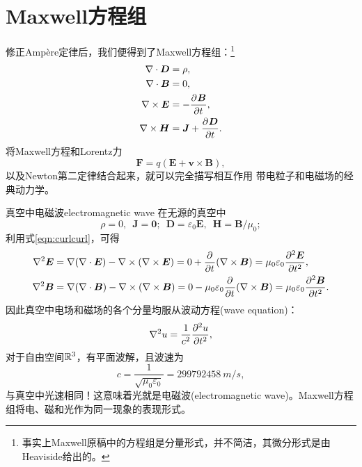 \section{Maxwell方程组}
修正Ampère定律后，我们便得到了Maxwell方程组：\footnote{事实上Maxwell原稿中的方程组是分量形式，并不简洁，其微分形式是由Heaviside给出的。}
\begin{subequations}
    \begin{align}
        \label{eqn:Maxwell divD}
        \div\bm D&=\rho,\\
        \label{eqn:Maxwell divB}
        \div\bm B&=0,\\
        \label{eqn:Maxwell curlE}
        \curl\bm E&=-\pv{\bm B}t,\\
        \label{eqn:Maxwell curlH}
        \curl\bm H&=\bm J+\pv{\bm D}t.
    \end{align}
\end{subequations}
将Maxwell方程和Lorentz力
\begin{equation}
    \label{eqn:Lorentz}
    \bm F=q(\bm E+\bm v\times\bm B),
\end{equation}
以及Newton第二定律结合起来，就可以完全描写相互作用 带电粒子和电磁场的经典动力学。
\begin{example}{真空中电磁波}{electromagnetic wave}
    在无源的真空中
    \[
        \rho=0,\enspace\bm J=\bm 0;\enspace\bm D=\varepsilon_0\bm E,\enspace\bm H=\bm B/\mu_0;
    \]
    利用式\eqref{eqn:curlcurl}，可得
    \begin{align*}
        \lapla\bm E&=\nabla(\div\bm E)-\curl(\curl\bm E)=0+\pp t(\curl\bm B)
        =\mu_0\varepsilon_0\pv[2]{\bm E}t,\\
        \lapla\bm B&=\nabla(\div\bm B)-\curl(\curl\bm B)=0-\mu_0\varepsilon_0\pp t(\curl\bm B)
        =\mu_0\varepsilon_0\pv[2]{\bm B}t.
    \end{align*}
    因此真空中电场和磁场的各个分量均服从波动方程(wave equation)：
    \begin{equation}
        \nabla^2u=\frac1{c^2}\pv[2]ut,
    \end{equation}
    对于自由空间$\RR^3$，有平面波解，且波速为
    \begin{equation}
        c=\frac1{\sqrt{\mu_0\varepsilon_0}}=\SI{299 792 458}{m/s},
    \end{equation}
    与真空中光速相同！这意味着光就是电磁波(electromagnetic wave)。Maxwell方程组将电、磁和光作为同一现象的表现形式。
\end{example}

